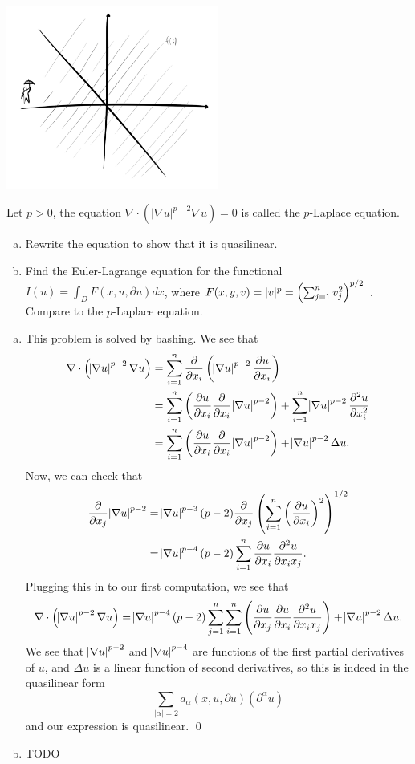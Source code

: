 \documentclass{article}
\newcommand{\D}{\nabla}
\renewcommand{\d}{\partial}
\begin{document}
\begin{center}
    \includegraphics[height=6cm]{../images/rain}
\end{center}

\newpage
{} Let $p > 0$, the equation $\D \cdot (|\D u|^{p-2}\D u) = 0$ is called the $p$-Laplace equation.
\begin{enumerate}[(a)]
    \item Rewrite the equation to show that it is quasilinear.
    \item Find the Euler-Lagrange equation for the functional $I(u) = \int_D F (x, u, \d u)dx$, where
    $F (x, y, v) = |v|^p =
    \del{\sum^n
    _{j=1} v^2_j
    }^{p/2}$
    . Compare to the $p$-Laplace equation.
\end{enumerate}\tri
\hop
\solution
\begin{enumerate}[(a)]
    \item This problem is solved by bashing. We see that 
    \begin{align*}
        \D \cdot \del{\abs{\D u}^{p-2}\D u} &=\sum_{i=1}^n \frac{\d}{\d x_i} \del{\abs{\D u}^{p-2}\frac{\d u}{\d x_i}} \\ 
        &= \sum_{i=1}^n \del{\frac{\d u}{\d x_i}\frac{\d}{\d x_i}\abs{\D u}^{p-2}}+\sum_{i=1}^n\abs{\D u}^{p-2}\frac{\d^2u}{\d x_i^2}\\
        &= \sum_{i=1}^n \del{\frac{\d u}{\d x_i}\frac{\d}{\d x_i}\abs{\D u}^{p-2}}+\abs{\D u}^{p-2}\Delta u.
    \end{align*}
    Now, we can check that 
    \begin{align*}
        \frac{\d}{\d x_j}\abs{\D u}^{p-2} &= \abs{\D u}^{p-3}(p-2)\frac{\d}{\d x_j} \del{\sum_{i=1}^n \del{\frac{\d u}{\d x_i}}^2}^{1/2} \\
        &= \abs{\D u}^{p-4} (p-2) \sum_{i=1}^n \frac{\d u }{\d x_i}\frac{\d^2 u}{\d x_i x_j}. 
    \end{align*}
    Plugging this in to our first computation, we see that 
    \begin{align*}
        \D \cdot \del{\abs{\D u}^{p-2}\D u} =  \abs{\D u}^{p-4}(p-2) \sum_{j=1}^n \sum_{i=1}^n \del{\frac{\d u}{\d x_j}\frac{\d u }{\d x_i}\frac{\d^2 u}{\d x_i x_j}}+\abs{\D u}^{p-2}\Delta u.
    \end{align*}
    We see that $\abs{\D u}^{p-2}$ and $\abs{\D u}^{p-4}$ are functions of the first partial derivatives of $u$, and $\Delta u$ is a linear function of second derivatives, so this is indeed in the quasilinear form 
    \[\sum_{|\alpha|=2}a_\alpha(x,u,\d u)(\d^\alpha u)\]
    and our expression is quasilinear. \qed
    \item TODO
\end{enumerate}
\end{document}
